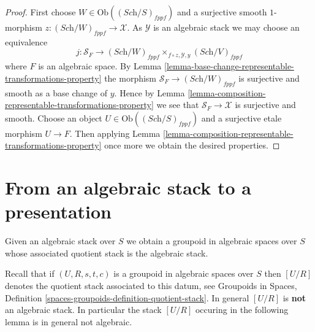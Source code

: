 \begin{proof}
First choose $W \in \text{Ob}((\textit{Sch}/S)_{fppf})$ and a surjective
smooth $1$-morphism $z : (\textit{Sch}/W)_{fppf} \to \mathcal{X}$.
As $\mathcal{Y}$ is an algebraic stack we may choose an equivalence
$$
j :
\mathcal{S}_F
\longrightarrow
(\textit{Sch}/W)_{fppf}
\times_{f \circ z, \mathcal{Y}, y}
(\textit{Sch}/V)_{fppf}
$$
where $F$ is an algebraic space. By
Lemma \ref{lemma-base-change-representable-transformations-property}
the morphism
$\mathcal{S}_F \to (\textit{Sch}/W)_{fppf}$ is surjective and smooth
as a base change of $y$. Hence by
Lemma \ref{lemma-composition-representable-transformations-property}
we see that $\mathcal{S}_F \to \mathcal{X}$ is surjective and smooth.
Choose an object $U \in \text{Ob}((\textit{Sch}/S)_{fppf})$
and a surjective etale morphism $U \to F$. Then applying
Lemma \ref{lemma-composition-representable-transformations-property}
once more we obtain the desired properties.
\end{proof}









\section{From an algebraic stack to a presentation}
\label{section-stack-to-presentation}

\noindent
Given an algebraic stack over $S$ we obtain a groupoid in algebraic spaces
over $S$ whose associated quotient stack is the algebraic stack.

\medskip\noindent
Recall that if $(U, R, s, t, c)$ is a groupoid in algebraic spaces over $S$
then $[U/R]$ denotes the quotient stack associated to this datum, see
Groupoids in Spaces,
Definition \ref{spaces-groupoids-definition-quotient-stack}.
In general $[U/R]$ is {\bf not} an algebraic stack. In particular the
stack $[U/R]$ occuring in the following lemma is in general not
algebraic.

